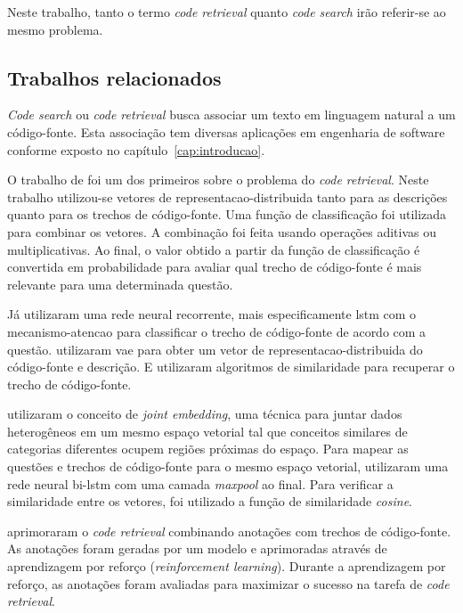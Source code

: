 Neste trabalho, tanto o termo \textit{code retrieval} quanto \textit{code search} irão referir-se ao mesmo problema.

\subsection{Trabalhos relacionados}\label{sec:code-retrieval-trabalhos-relacionados}

\textit{Code search} ou \textit{code retrieval} busca associar um texto em linguagem natural a um código-fonte. Esta associação tem diversas aplicações em engenharia de software conforme exposto no capítulo~\ref{cap:introducao}.

O trabalho de \cite{Allamanis-bimodal-source-code-natural-language:2015} foi um dos primeiros sobre o problema do \textit{code retrieval}. Neste trabalho utilizou-se vetores de \gls{representacao-distribuida} tanto para as descrições quanto para os trechos de código-fonte. Uma função de classificação foi utilizada para combinar os vetores. A combinação foi feita usando operações aditivas ou multiplicativas. Ao final, o valor obtido a partir da função de classificação é convertida em probabilidade para avaliar qual trecho de código-fonte é mais relevante para uma determinada questão.

Já \cite{iyer-etal-2016-summarizing} utilizaram uma rede neural recorrente, mais especificamente \acrshort{lstm} com o \gls{mecanismo-atencao} para classificar o trecho de código-fonte de acordo com a questão. \cite{Chen-bi-variational-autoencoder:2018} utilizaram \acrfull{vae} para obter um vetor de \gls{representacao-distribuida} do código-fonte e descrição. E utilizaram algoritmos de similaridade para recuperar o trecho de código-fonte.

\cite{Gu-deep-code-search:2018} utilizaram o conceito de \textit{joint embedding}, uma técnica para juntar dados heterogêneos em um mesmo espaço vetorial tal que conceitos similares de categorias diferentes ocupem regiões próximas do espaço. Para mapear as questões e trechos de código-fonte para o mesmo espaço vetorial, \cite{Gu-deep-code-search:2018} utilizaram uma rede neural bi-\acrshort{lstm} com uma camada \textit{maxpool} ao final. Para verificar a similaridade entre os vetores, foi utilizado a função de similaridade \textit{cosine}.

\cite{Yao-coacor:2019} aprimoraram o \textit{code retrieval} combinando anotações com trechos de código-fonte. As anotações foram geradas por um modelo e aprimoradas através de aprendizagem por reforço (\textit{reinforcement learning}). Durante a aprendizagem por reforço, as anotações foram avaliadas para maximizar o sucesso na tarefa de \textit{code retrieval}.


